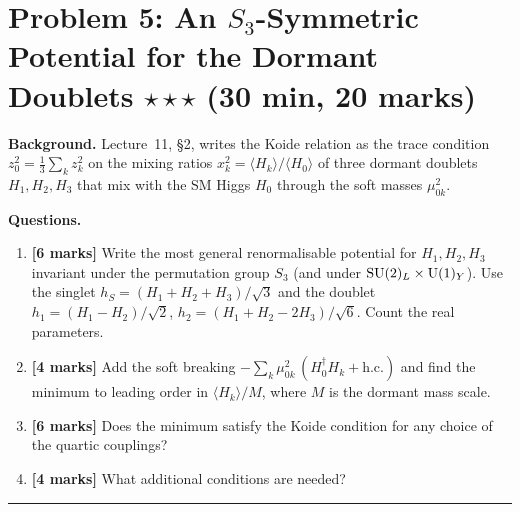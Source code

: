 \documentclass[11pt,a4paper]{article}
\begin{document}
\section*{Problem 5: An $S_3$-Symmetric Potential for the Dormant
  Doublets
  \hfill $\star\star\star$ \normalsize(30 min, 20 marks)}
\label{prob:s3}

\noindent\textbf{Background.}
Lecture~11, \S2, writes the Koide relation as the trace condition
$z_0^2 = \tfrac13\sum_k z_k^2$ on the mixing ratios
$x_k^2 = \langle H_k\rangle/\langle H_0\rangle$ of three dormant
doublets $H_1, H_2, H_3$ that mix with the SM Higgs $H_0$ through the
soft masses $\mu_{0k}^2$.

\medskip

\noindent\textbf{Questions.}
\begin{enumerate}[label=(\alph*)]
  \item \textbf{[6 marks]}
    Write the most general renormalisable potential for $H_1, H_2, H_3$
    invariant under the permutation group $S_3$ (and under
    $\mathrm{SU}(2)_L\times\mathrm{U}(1)_Y$).  Use the singlet
    $h_S = (H_1+H_2+H_3)/\sqrt3$ and the doublet
    $h_1 = (H_1-H_2)/\sqrt2$, $h_2 = (H_1+H_2-2H_3)/\sqrt6$.  Count the
    real parameters.
  \item \textbf{[4 marks]}
    Add the soft breaking
    $-\sum_k \mu_{0k}^2\,(H_0^\dagger H_k + \text{h.c.})$ and find the
    minimum to leading order in $\langle H_k\rangle/M$, where $M$ is the
    dormant mass scale.
  \item \textbf{[6 marks]}
    Does the minimum satisfy the Koide condition for any choice of the
    quartic couplings?
  \item \textbf{[4 marks]}
    What additional conditions are needed?
\end{enumerate}


\bigskip
\hrule
\bigskip
\end{document}
